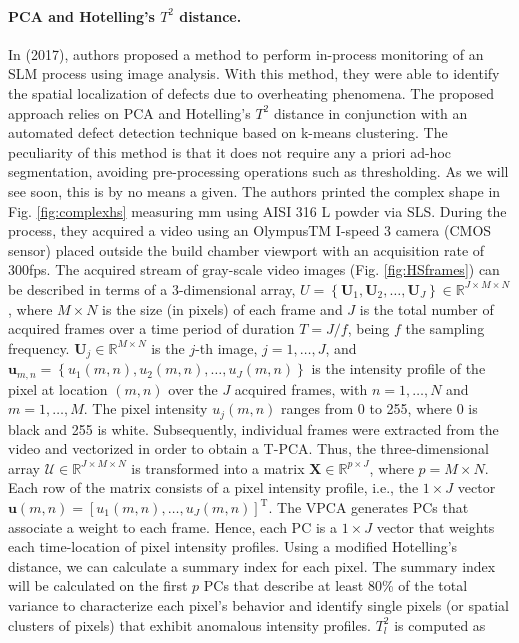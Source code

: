 \paragraph{PCA and Hotelling's $T^2$ distance.} In \citeauthor{grasso_-process_2017} (2017), authors proposed a method to perform in-process monitoring of an SLM process using image analysis. With this method, they were able to identify the spatial localization of defects due to overheating phenomena. The proposed approach relies on PCA and Hotelling's $T^2$ distance in conjunction with an automated defect detection technique based on k-means clustering. The peculiarity of this method is that it does not require any a priori ad-hoc segmentation, avoiding pre-processing operations such as thresholding. As we will see soon, this is by no means a given. The authors printed the complex shape in Fig. \ref{fig:complexhs} measuring  \unit{\milli\metre} using AISI 316 L powder via SLS. During the process, they acquired a video using an OlympusTM I-speed 3 camera (CMOS sensor) placed outside the build chamber viewport with an acquisition rate of 300fps. The acquired stream of gray-scale video images (Fig. \ref{fig:HSframes}) can be described in terms of a 3-dimensional array, $U=\left\{\boldsymbol{U}_1, \boldsymbol{U}_2, \ldots, \boldsymbol{U}_J\right\} \in \mathbb{R}^{J \times M \times N}$, where $M \times N$ is the size (in pixels) of each frame and $J$ is the total number of acquired frames over a time period of duration $T=J / f$, being $f$ the sampling frequency. $\boldsymbol{U}_j \in \mathbb{R}^{M \times N}$ is the $j$-th image, $j=1, \ldots, J$, and $\boldsymbol{u}_{m, n}=\left\{u_1(m,n), u_2(m, n), \ldots, u_J(m,n)\right\}$ is the intensity profile of the pixel at location $(m, n)$ over the $J$ acquired frames, with $n=1, \ldots, N$ and $m=1, \ldots, M$. The pixel intensity $u_j(m,n)$ ranges from 0 to 255, where 0 is black and 255 is white. Subsequently, individual frames were extracted from the video and vectorized in order to obtain a T-PCA. Thus, the three-dimensional array $\mathcal{U} \in \mathbb{R}^{J \times M \times N}$ is transformed into a matrix $\mathbf{X} \in \mathbb{R}^{p \times J}$, where $p=M \times N$. Each row of the matrix consists of a pixel intensity profile, i.e., the $1 \times J$ vector $\boldsymbol{u}(m, n)=\left[u_1(m, n), \ldots, u_J(m, n)\right]^{\mathrm{T}}$. The VPCA generates PCs that associate a weight to each frame. Hence, each PC is a $1 \times J$ vector that weights each time-location of pixel intensity profiles. Using a modified Hotelling's distance, we can calculate a summary index for each pixel. The summary index will be calculated on the first $p$ PCs that describe at least 80\% of the total variance to characterize each pixel's behavior and identify single pixels (or spatial clusters of pixels) that exhibit anomalous intensity profiles. $T_l^2$ is computed as
